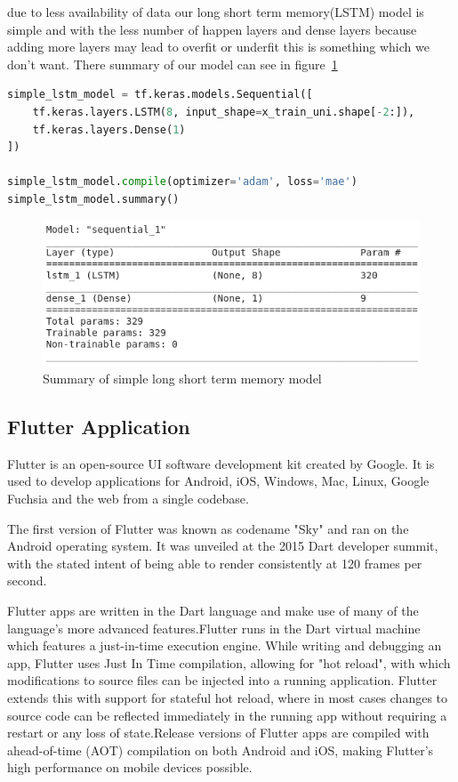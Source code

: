 due to less availability of data our long short term memory(LSTM) model is simple and with the less number of happen layers and dense layers because adding more layers may lead to overfit or underfit this is something which we don't want. There summary of our model can see in figure~\ref{img45}

\begin{lstlisting}[language=Python, caption= Creating a LSTM model with their summary]
simple_lstm_model = tf.keras.models.Sequential([
    tf.keras.layers.LSTM(8, input_shape=x_train_uni.shape[-2:]),
    tf.keras.layers.Dense(1)
])

simple_lstm_model.compile(optimizer='adam', loss='mae')
simple_lstm_model.summary()

\end{lstlisting}

\begin{figure}[!ht]
\centering
\includegraphics[width=\linewidth]{figures/model-summary.png}
\caption{\label{img45} Summary of simple long short term memory model}
\end{figure}

\subsection{Flutter Application}
Flutter is an open-source UI software development kit created by Google. It is used to develop applications for Android, iOS, Windows, Mac, Linux, Google Fuchsia and the web from a single codebase.

The first version of Flutter was known as codename "Sky" and ran on the Android operating system. It was unveiled at the 2015 Dart developer summit, with the stated intent of being able to render consistently at 120 frames per second.

Flutter apps are written in the Dart language and make use of many of the language's more advanced features.Flutter runs in the Dart virtual machine which features a just-in-time execution engine. While writing and debugging an app, Flutter uses Just In Time compilation, allowing for "hot reload", with which modifications to source files can be injected into a running application. Flutter extends this with support for stateful hot reload, where in most cases changes to source code can be reflected immediately in the running app without requiring a restart or any loss of state.Release versions of Flutter apps are compiled with ahead-of-time (AOT) compilation on both Android and iOS, making Flutter's high performance on mobile devices possible.

